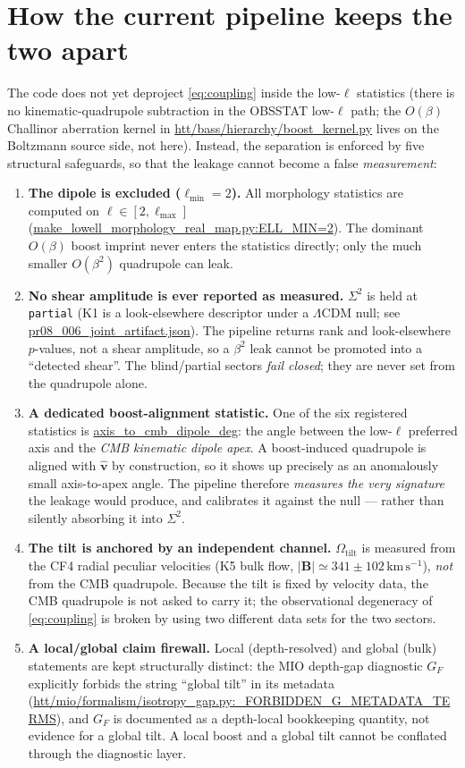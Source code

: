 \documentclass[11pt]{article}
\newcommand{\code}[1]{\texttt{\small #1}}
\newcommand{\pathx}[1]{{\small\urlstyle{tt}\url{#1}}}  %
\newcommand{\Sig}{\Sigma^2}
\newcommand{\Otilt}{\Omega_{\mathrm{tilt}}}
\newcommand{\vhat}{\hat{\mathbf v}}
\begin{document}
\section{How the current pipeline keeps the two apart}
\label{sec:safeguards}

The code does not yet deproject \eqref{eq:coupling} inside the low-$\ell$
statistics (there is no kinematic-quadrupole subtraction in the OBSSTAT
low-$\ell$ path; the $O(\beta)$ Challinor aberration kernel in
\pathx{htt/bass/hierarchy/boost_kernel.py} lives on the Boltzmann source side,
not here). Instead, the separation is enforced by five structural safeguards, so
that the leakage cannot become a false \emph{measurement}:

\begin{enumerate}
\item \textbf{The dipole is excluded ($\ell_{\min}=2$).} All morphology
statistics are computed on $\ell\in[2,\ell_{\max}]$
(\pathx{make_lowell_morphology_real_map.py:ELL_MIN=2}). The dominant
$O(\beta)$ boost imprint never enters the statistics directly; only the much
smaller $O(\beta^2)$ quadrupole can leak.
\item \textbf{No shear amplitude is ever reported as measured.} $\Sig$ is held at
\code{partial} (K1 is a look-elsewhere descriptor under a $\Lambda$CDM null; see
\pathx{pr08_006_joint_artifact.json}). The pipeline returns rank and
look-elsewhere $p$-values, not a shear amplitude, so a $\beta^2$ leak cannot be
promoted into a ``detected shear''. The blind/partial sectors \emph{fail closed};
they are never set from the quadrupole alone.
\item \textbf{A dedicated boost-alignment statistic.} One of the six registered
statistics is \pathx{axis_to_cmb_dipole_deg}: the angle between the low-$\ell$
preferred axis and the \emph{CMB kinematic dipole apex}. A boost-induced
quadrupole is aligned with $\vhat$ by construction, so it shows up precisely as
an anomalously small axis-to-apex angle. The pipeline therefore \emph{measures
the very signature} the leakage would produce, and calibrates it against the null
--- rather than silently absorbing it into $\Sig$.
\item \textbf{The tilt is anchored by an independent channel.} $\Otilt$ is
measured from the CF4 radial peculiar velocities (K5 bulk flow,
$|\mathbf B|\simeq341\pm102\,\mathrm{km\,s^{-1}}$), \emph{not} from the CMB
quadrupole. Because the tilt is fixed by velocity data, the CMB quadrupole is not
asked to carry it; the observational degeneracy of \eqref{eq:coupling} is broken
by using two different data sets for the two sectors.
\item \textbf{A local/global claim firewall.} Local (depth-resolved) and global
(bulk) statements are kept structurally distinct: the MIO depth-gap diagnostic
$G_F$ explicitly forbids the string ``global tilt'' in its metadata
(\pathx{htt/mio/formalism/isotropy_gap.py:_FORBIDDEN_G_METADATA_TERMS}), and
$G_F$ is documented as a depth-local bookkeeping quantity, not evidence for a
global tilt. A local boost and a global tilt cannot be conflated through the
diagnostic layer.
\end{enumerate}
\end{document}
